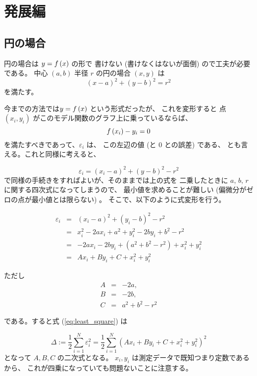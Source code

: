 \documentclass[12pt]{jsarticle}
\def\error{\varepsilon}
\def\sumdata{\sum_{i=1}^{N}}
\begin{document}
\section{発展編}

\subsection{円の場合}

円の場合は $y = f \left( x \right)$ の形で
書けない (書けなくはないが面倒) ので工夫が必要である。
中心 $(a, b)$ 半径 $r$ の円の場合 $(x, y)$ は
\begin{equation}
  (x - a)^2 + (y - b)^2 = r^2
\end{equation}
を満たす。

今までの方法では$y = f \left( x \right)$ という形式だったが、
これを変形すると 点 $(x_i, y_i)$ がこのモデル関数のグラフ上に乗っているならば、
\begin{equation}
  f \left( x_i \right) - y_i = 0
\end{equation}
を満たすべきであって、$\error_i$ は、
この左辺の値 (と $0$ との誤差) である、
とも言える。これと同様に考えると、

\begin{equation}
  \error_i = (x_i - a)^2 + (y - b)^2 - r^2
\end{equation}
で同様の手続きをすればよいが、そのままでは上の式を
二乗したときに $a$, $b$, $r$ に関する四次式になってしまうので、
最小値を求めることが難しい (偏微分がゼロの点が最小値とは限らない) 。
そこで、以下のように式変形を行う。

\begin{eqnarray}
  \error_i &=& (x_i - a)^2 + (y_i - b)^2 - r^2 \nonumber \\
  &=& x_i^2 - 2 a x_i + a^2 + y_i^2 - 2 b y_i + b^2 - r^2 \nonumber \\
  &=& - 2 a x_i - 2 b y_i + (a^2 + b^2 - r^2) + x_i^2 + y_i^2 \nonumber \\
  &=& A x_i + B y_i + C + x_i^2 + y_i^2
\end{eqnarray}

ただし
\begin{eqnarray}
  A &=& -2a, \nonumber \\
  B &=& -2b, \nonumber \\
  C &=& a^2 + b^2 - r^2 \label{eq:lsm_circle_assign}
\end{eqnarray}

である。すると式 (\ref{eq:least_square}) は

\begin{equation}
  \Delta := \frac{1}{2} \sumdata \error_i^2
  = \frac{1}{2} \sumdata \left(
  A x_i + B y_i + C + x_i^2 + y_i^2
  \right)^2
\end{equation}
となって $A, B, C$ の二次式となる。
$x_i, y_i$ は測定データで既知つまり定数であるから、
これが四乗になっていても問題ないことに注意する。
\end{document}
